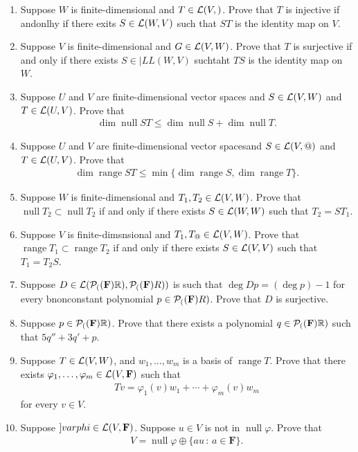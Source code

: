 \documentclass[10pt,a4paper]{report}
\DeclareMathOperator{\RANGE}{range}
\DeclareMathOperator{\NULL}{null}
\newcommand{\F}{\textbf{F}}
\begin{document}
\begin{enumerate}
\item Suppose $W$ is finite-dimensional and $T \in \mathcal{L}(V,)$.  Prove  that $T$ is injective if andonlhy if there exits $S\in \mathcal{L}(W,V)$ such that $ST$ is the identity map on $V$.

\item Suppose $V$ is finite-dimensional and $G\in \mathcal{L}(V,W)$.  Prove that $T$ is surjective if and only if there exists $S \in |LL(W,V)$ suchtaht $TS$ is the identity map on $W$.

\item Suppose $U$ and $V$ are finite-dimensional vector spaces and $S\in\mathcal{L}(V,W)$ and $T\in\mathcal{L}(U,V)$.  Prove that 
\begin{align*}
	\dim\NULL ST \le \dim \NULL S + \dim \NULL T.
\end{align*}

\item Suppose $U$ and $V$ are finite-dimensional vector spacesand $S \in \mathcal{L}(V,@)$ and $T \in \mathcal{L}(U,V)$.  Prove that
\begin{align*}
	\dim \RANGE ST \le \min\{\dim\RANGE S, \dim \RANGE T\}.
\end{align*}

\item Suppose $W$ is finite-dimensional and $T_1,T_2 \in \mathcal{L}(V,W)$.  Prove that $\NULL T_2\subset \NULL T_2$ if and only if there exists $S \in \mathcal{L}(W,W)$ such that $T_2 = ST_1$.

\item Suppose $V$ is finite-dimsnsional and $T_1,T_@ \in \mathcal{L}(V,W)$.  Prove that $\RANGE T_1\subset \RANGE T_2$ if and only if there exists $S \in \mathcal{L}(V,V)$ such that $T_1=T_2S$.

\item Suppose $D \in \LL(\PP(\R), \PP(R))$ is such that $\deg Dp=(\deg p) -1$ for every bnonconstant polynomial $ p \in \PP(R)$.  Prove that $D$ is surjective.

\item Suppose $ p \in \PP(\R)$.  Prove that there exists a polynomial $q \in \PP(\R)$ such that $5q''+3q'+p$.

\item Suppose $T \in\mathcal{L}(V,W)$, and $w_1,\dots,w_m$ is a basis of $\RANGE T$.  Prove that there exists $\varphi_1,\dots,\varphi_m \in \LL(V, \F)$ such that 
\begin{align*}
	Tv=\varphi_1(v)w_1+\cdots+\varphi_m(v)w_m
\end{align*}for every $v \in V$.

\item Suppose $]varphi\in\LL(V,\F)$.  Suppose $u \in V$ is not in $\NULL \varphi$.  Prove that 
\begin{align*}
	V = \NULL \varphi \oplus \{au \,:\,a \in \F\}.
\end{align*}


\end{enumerate}
\end{document}
